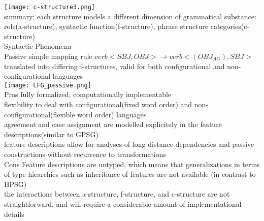 \texttt{[image: c-structure3.png]}\\
{\tiny summary: each structure models a different dimension of grammatical substance: role(a-structure), syntactic function(f-structure), phrase structure categories(c-structure)}\\
\scriptsize{Syntactic Phenomena\\
Passive} 
{\tiny simple mapping rule $verb<SBJ,OBJ> \to verb<(OBJ_{AG}),SBJ>$\\
translated into differing f-structures, valid for both configurational and non-configurational languages
}\\
\texttt{[image: LFG\_passive.png]}\\
\scriptsize{Pros} 
{\tiny fully formalized, computationally implementable\\
flexibility to deal with configurational(fixed word order) and non-configurational(flexible word order) languages\\
agreement and case assignment are modelled explicitely in the feature descriptions(similar to GPSG)\\
feature descriptions allow for analyses of long-distance dependencies and passive constructions without recurrence to transformations
}\\
\scriptsize{Cons} 
{\tiny Feature descriptions are untyped, which means that generalizations in terms of type hiearchies such as inheritance of features are not available (in contrast to HPSG)\\
the interactions between a-structure, f-structure, and c-structure are not straightforward, and will require a considerable amount of implementational details 
}